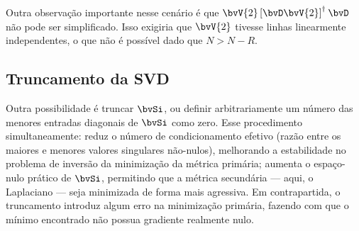 Outra observação importante nesse cenário é que $\bvV{2} \pinv*{\bvD \bvV{2}} \bvD$ não pode ser simplificado. Isso exigiria que $\bvV{2}$ tivesse linhas linearmente independentes, o que não é possível dado que $N > N-R$. %

\subsection{Truncamento da SVD}
\label{subsec:sec2:truncamento}

Outra possibilidade é truncar $\bvSi$, ou definir arbitrariamente um número das menores entradas diagonais de $\bvSi$ como zero. Esse procedimento simultaneamente: reduz o número de condicionamento efetivo (razão entre os maiores e menores valores singulares não-nulos), melhorando a estabilidade no problema de inversão da minimização da métrica primária; aumenta o espaço-nulo prático de $\bvSi$, permitindo que a métrica secundária --- aqui, o Laplaciano --- seja minimizada de forma mais agressiva. Em contrapartida, o truncamento introduz algum erro na minimização primária, fazendo com que o mínimo encontrado não possua gradiente realmente nulo.

